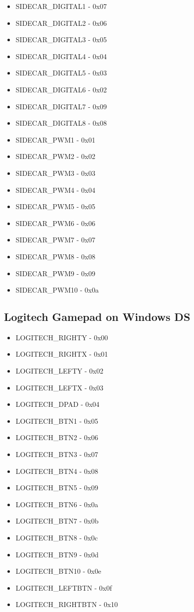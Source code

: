 \documentclass[11pt]{article} %
\begin{document}
\begin{itemize}
\item SIDECAR\_DIGITAL1 - 0x07
\item SIDECAR\_DIGITAL2 - 0x06
\item SIDECAR\_DIGITAL3 - 0x05
\item SIDECAR\_DIGITAL4 - 0x04
\item SIDECAR\_DIGITAL5 - 0x03
\item SIDECAR\_DIGITAL6 - 0x02
\item SIDECAR\_DIGITAL7 - 0x09
\item SIDECAR\_DIGITAL8 - 0x08
\item SIDECAR\_PWM1 - 0x01
\item SIDECAR\_PWM2 - 0x02
\item SIDECAR\_PWM3 - 0x03
\item SIDECAR\_PWM4 - 0x04
\item SIDECAR\_PWM5 - 0x05
\item SIDECAR\_PWM6 - 0x06
\item SIDECAR\_PWM7 - 0x07
\item SIDECAR\_PWM8 - 0x08
\item SIDECAR\_PWM9 - 0x09
\item SIDECAR\_PWM10 - 0x0a
\end{itemize}

\newpage

\subsection{Logitech Gamepad on Windows DS}

\begin{itemize}
\item LOGITECH\_RIGHTY - 0x00
\item LOGITECH\_RIGHTX - 0x01
\item LOGITECH\_LEFTY - 0x02
\item LOGITECH\_LEFTX - 0x03
\item LOGITECH\_DPAD - 0x04
\item LOGITECH\_BTN1 - 0x05
\item LOGITECH\_BTN2 - 0x06
\item LOGITECH\_BTN3 - 0x07
\item LOGITECH\_BTN4 - 0x08
\item LOGITECH\_BTN5 - 0x09
\item LOGITECH\_BTN6 - 0x0a
\item LOGITECH\_BTN7 - 0x0b
\item LOGITECH\_BTN8 - 0x0c
\item LOGITECH\_BTN9 - 0x0d
\item LOGITECH\_BTN10 - 0x0e
\item LOGITECH\_LEFTBTN - 0x0f
\item LOGITECH\_RIGHTBTN - 0x10
\end{itemize}
\end{document}
